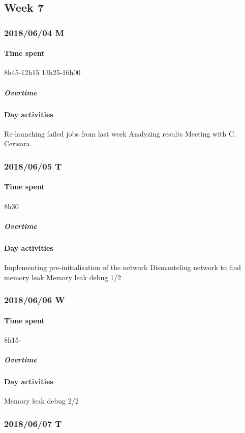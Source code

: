 \subsection{Week 7}
\subsubsection{2018/06/04 M}
\paragraph{Time spent}
{8h45}-{12h15}
{13h25}-{16h00}

\subparagraph{Overtime}


\paragraph{Day activities}
Re-launching failed jobs from last week
Analyzing results
Meeting with C. Cerisara

\subsubsection{2018/06/05 T}
\paragraph{Time spent}
{8h30}

\subparagraph{Overtime}

\paragraph{Day activities}
Implementing pre-initialisation of the network
Dismanteling network to find memory leak
Memory leak debug 1/2

\subsubsection{2018/06/06 W}
\paragraph{Time spent}
{8h15}-

\subparagraph{Overtime}


\paragraph{Day activities}
Memory leak debug 2/2

\subsubsection{2018/06/07 T}
